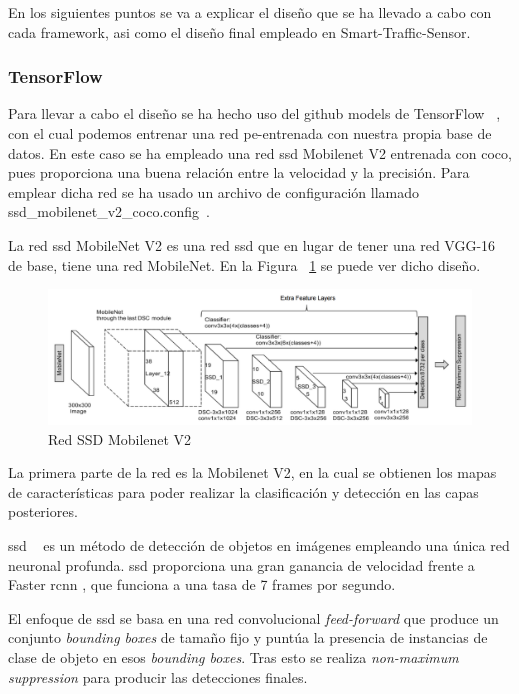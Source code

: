 En los siguientes puntos se va a explicar el diseño que se ha llevado a cabo con cada framework, asi como el diseño final empleado en Smart-Traffic-Sensor.

\subsubsection{TensorFlow}

Para llevar a cabo el diseño se ha hecho uso del github models de TensorFlow ~\cite{tensorflow_models}, con el cual podemos entrenar una red pe-entrenada con nuestra propia base de datos. En este caso se ha empleado una red \acrfull{ssd} Mobilenet V2 entrenada con \acrshort{coco}, pues proporciona una buena relación entre la velocidad y la precisión. Para emplear dicha red se ha usado un archivo de configuración llamado ssd\_mobilenet\_v2\_coco.config~\cite{ssd_mobilenetv2_config}.

La red \acrshort{ssd} MobileNet V2 es una red \acrshort{ssd} que en lugar de tener una red VGG-16 de base, tiene una red MobileNet. En la Figura ~\ref{fig.ssd_mobilenet} se puede ver dicho diseño.

\begin{figure}
\begin{center}
	\includegraphics[width=1\textwidth]{figures/Diseno_global/ssd_mobilenet.png}
   \caption{Red SSD Mobilenet V2}
	\label{fig.ssd_mobilenet}
\end{center}
\end{figure}

La primera parte de la red es la Mobilenet V2, en la cual se obtienen los mapas de características para poder realizar la clasificación y detección en las capas posteriores. 

\acrshort{ssd} ~\cite{ssd_article} es un método de detección de objetos en imágenes empleando una única red neuronal profunda. \acrshort{ssd} proporciona una gran ganancia de velocidad frente a Faster \acrshort{rcnn} \cite{rcnn_faster}, que funciona a una tasa de 7 frames por segundo.

El enfoque de \acrshort{ssd} se basa en una red convolucional \textit{feed-forward} que produce un conjunto \textit{bounding boxes} de tamaño fijo y puntúa la presencia de instancias de clase de objeto en esos \textit{bounding boxes}. Tras esto se realiza \textit{non-maximum suppression} para producir las detecciones finales. 

